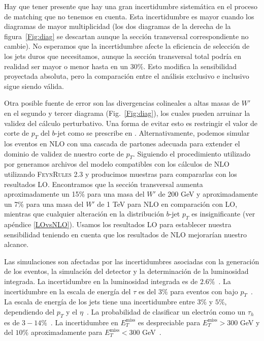 Hay que tener presente que hay una gran incertidumbre sistemática en el proceso de matching que no tenemos en cuenta. Esta incertidumbre es mayor cuando los diagramas de mayor multiplicidad (los dos diagramas de la derecha de la figura~\ref{Fig:diag} se descartan aunque la sección transversal correspondiente no cambie). No esperamos que la incertidumbre afecte la eficiencia de selección de los jets duros que necesitamos, aunque la sección transversal total podría en realidad ser mayor o menor hasta en un $30\%$. Esto modifica la sensibilidad proyectada absoluta, pero la comparación entre el análisis exclusivo e inclusivo sigue siendo válida.

Otra posible fuente de error son las divergencias colineales a altas masas de $W'$ en el segundo y tercer diagrama (Fig.~\ref{Fig:diag}), los cuales pueden arruinar la validez del cálculo perturbativo. Una forma de evitar esto es restringir el valor de corte de $p_T$ del $b$-jet como se prescribe en \cite{Degrande:2016aje}. Alternativamente, podemos simular los eventos en NLO con una cascada de partones adecuada para extender el dominio de validez de nuestro corte de $p_T$. Siguiendo el procedimiento utilizado por \cite{Fuks:2017vtl} generamos archivos del modelo compatibles con los cálculos de NLO utilizando \textsc{FeynRules 2.3} \cite{Degrande:2014vpa} y producimos muestras para compararlas con los resultados LO. Encontramos que la sección transversal aumenta aproximadamente un 15\% para una masa del $W'$ de 200 GeV y aproximadamente un 7\% para una masa del $W'$ de 1 TeV para NLO en comparación con LO, mientras que cualquier alteración en la distribución $b$-jet $p_T$ es insignificante (ver apéndice \ref{LOvsNLO}). Usamos los resultados LO para establecer nuestra sensibilidad teniendo en cuenta que los resultados de NLO mejorarían nuestro alcance.

Las simulaciones son afectadas por las incertidumbres asociadas con la generación de los eventos, la simulación del detector y la determinación de la luminosidad integrada. La incertidumbre en la luminosidad integrada es de $2.6\%$~\cite{CMS-PAS-LUM-13-001}. La incertidumbre en la escala de energía del $\tau$ es del $3\%$ para eventos con bajo $p_{T}$~\cite{Khachatryan:2015dfa}. La escala de energía de los jets tiene una incertidumbre entre $3\%$ y $5\%$, dependiendo del $p_{T}$ y el $\eta$~\cite{Khachatryan:2016kdb}. La probabilidad de clasificar un electrón como un $\tau_h$  es de $3-14\%$~\cite{ATLAS-CONF-2017-029}. La incertidumbre en $E^{\text{miss}}_{T}$ es despreciable para $E^{\text{miss}}_{T} > 300$ GeV y del $10\%$ aproximadamente para $E^{\text{miss}}_{T} < 300$ GeV~\cite{Aaboud:2018vgh}.

